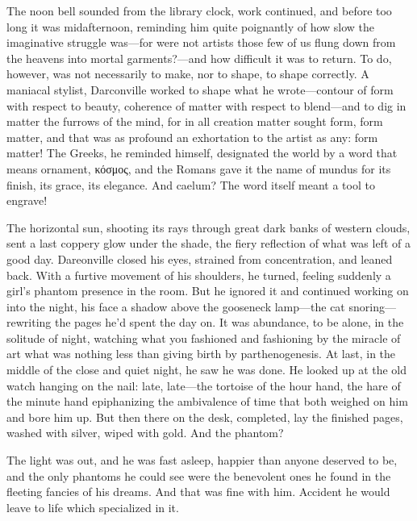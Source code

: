   The noon bell sounded from the library clock, work continued, and before too
long it was midafternoon, reminding him quite poignantly 
of how slow the
imaginative struggle was---for were not artists those few of us flung 
down from the heavens into mortal garments?---and how difficult it was to 
return. To do, however, was not necessarily to make, nor to shape, to shape 
correctly. A maniacal 
stylist, Darconville worked to shape what he wrote---contour of form with
respect to beauty, coherence of matter with respect to blend---and to dig in
matter the furrows 
of the mind, for in all creation matter sought form, form
matter, and that was as profound an exhortation 
to the artist as any: form
matter! The Greeks, he reminded himself, designated the world by a word that
means ornament, κόσμος, and the Romans gave it the name of mundus for its
finish, its grace, its elegance. And caelum? The word itself meant a tool to
engrave!

  The horizontal sun, shooting its rays through great dark banks of western
clouds, sent a last coppery glow under the shade, the fiery 
reflection of what was left of a good day. Dareonville closed his eyes, 
strained from concentration, and leaned back. With a furtive 
movement of his shoulders, he
turned, feeling suddenly a girl's phantom presence in the room. But he ignored
it and continued working on into the night, his face a shadow above the
gooseneck lamp---the cat snoring---rewriting the pages he'd spent the day on. 
It was abundance, to be alone, in the solitude of night, watching what you 
fashioned and fashioning by the miracle of art what was nothing less than 
giving birth by parthenogenesis. 
At last, in the middle of the close and quiet night, he saw he
was done. He looked up at the old watch hanging on the nail: late, late---the
tortoise of the hour hand, the hare of the minute hand epiphanizing 
the ambivalence of time that both weighed on him and bore him up. But then 
there on the desk, completed, lay the finished pages, washed with silver, 
wiped with gold. And the phantom?

  The light was out, and he was fast asleep, happier than anyone deserved to be,
and the only phantoms he could see were the benevolent ones he found in the
fleeting fancies of his dreams. And that was fine with him. Accident he would
leave to life which specialized in it.
